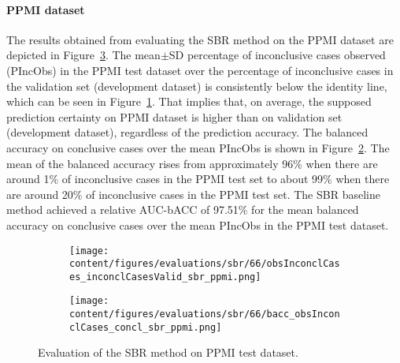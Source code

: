 


\paragraph{PPMI dataset}

The results obtained from evaluating the SBR method on the PPMI dataset 
are depicted in Figure~\ref{fig:perf_results_sbr_ppmi}.
The mean$\pm$SD percentage of inconclusive cases observed (PIncObs) in the PPMI test dataset 
over the percentage of inconclusive cases in the validation set (development dataset) 
is consistently below the identity line, 
which can be seen in Figure~\ref{fig:obsInconclCases_inconclCasesValid_sbr_ppmi}.
That implies that, on average, the supposed prediction certainty on PPMI dataset is higher than on validation set (development dataset),
regardless of the prediction accuracy.
The balanced accuracy on conclusive cases over the mean PIncObs is shown 
in Figure~\ref{fig:bacc_obsInconclCases_concl_sbr_ppmi}.
The mean of the balanced accuracy rises from approximately 96\% 
when there are around 1\% of inconclusive cases in the PPMI test set to about 99\% 
when there are around 20\% of inconclusive cases in the PPMI test set.
The SBR baseline method achieved a relative AUC-bACC of 97.51\% for the mean balanced accuracy on conclusive cases 
over the mean PIncObs in the PPMI test dataset.


\begin{figure}[ht]
  \begin{subfigure}{0.49\textwidth}
    \centering
    \texttt{[image: content/figures/evaluations/sbr/66/obsInconclCases\_inconclCasesValid\_sbr\_ppmi.png]}
    \label{fig:obsInconclCases_inconclCasesValid_sbr_ppmi}
  \end{subfigure}
  \hfill
  \begin{subfigure}{0.49\textwidth}
    \centering
    \texttt{[image: content/figures/evaluations/sbr/66/bacc\_obsInconclCases\_concl\_sbr\_ppmi.png]}
    \label{fig:bacc_obsInconclCases_concl_sbr_ppmi}
  \end{subfigure}
  \caption{Evaluation of the SBR method on PPMI test dataset.}
  \label{fig:perf_results_sbr_ppmi}
\end{figure}




